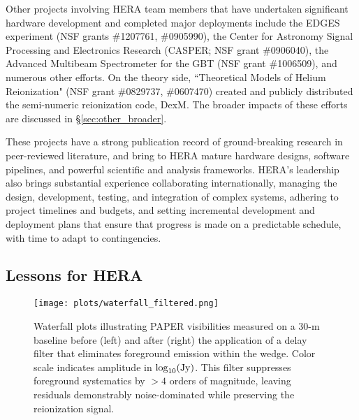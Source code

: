 \documentclass[preprint]{aastex}
\newcommand{\compress}{\vspace{-0.25in}}
\newcommand{\Caption}[4]{\vspace{#1}\renewcommand{\baselinestretch}{#2}\caption{#4}\vspace{#3}}
\begin{document}
\noindent
Other projects involving HERA team members that have undertaken significant hardware development and
completed major deployments include the EDGES experiment (NSF grants \#1207761, \#0905990),
the Center for Astronomy Signal Processing and Electronics Research (CASPER; NSF grant \#0906040), the Advanced Multibeam
Spectrometer for the GBT (NSF grant \#1006509), and numerous other efforts.  On the theory side, 
``Theoretical Models of Helium Reionization" (NSF grant \#0829737, \#0607470) 
created and publicly distributed the semi-numeric reionization code, DexM.  The broader impacts of these
efforts are discussed in \S\ref{sec:other_broader}.

These projects have a strong publication record of ground-breaking research in peer-reviewed literature, and
bring to HERA mature hardware designs, software pipelines, and powerful scientific and analysis frameworks.
HERA's leadership also brings substantial experience
collaborating internationally, managing the design, development, testing, and integration of complex systems,
adhering to project timelines and budgets, and setting incremental development and deployment plans that
ensure that progress is made on a predictable schedule, with time to adapt to contingencies.

\compress
\subsection{Lessons for HERA}
\label{sec:Lessons}

\begin{figure}[t]\centering
\texttt{[image: plots/waterfall\_filtered.png]}
\Caption{-0.15in}{0.99}{-0.15in}{\small 
Waterfall plots illustrating PAPER visibilities
measured on a 30-m baseline before (left) and after (right) the application of a 
delay filter that eliminates foreground emission within the wedge.  Color scale indicates amplitude in $\log_{10}({\rm Jy})$.
This filter suppresses
foreground systematics by $>4$ orders of magnitude, leaving residuals demonstrably noise-dominated while preserving the reionization signal.
}\label{fig:waterfall} \end{figure}
\end{document}
